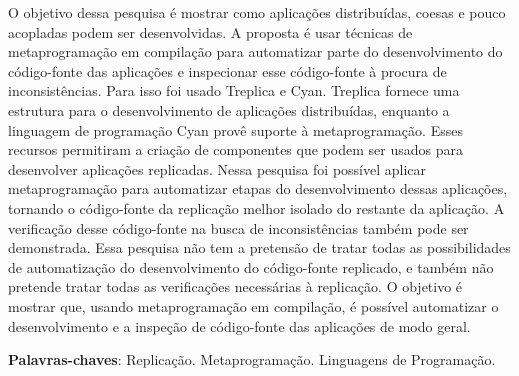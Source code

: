 \setlength{\absparsep}{18pt} %
                     
\begin{resumo}
\setlength{}
\setlength\emergencystretch{1pt}
O objetivo dessa pesquisa é mostrar como aplicações distribuídas, coesas e pouco acopladas podem ser desenvolvidas. A proposta é usar técnicas de metaprogramação em compilação para automatizar parte do desenvolvimento do código-fonte das aplicações e inspecionar esse código-fonte à procura de inconsistências. Para isso foi usado Treplica e Cyan. Treplica fornece uma estrutura para o desenvolvimento de aplicações distribuídas, enquanto a linguagem de programação Cyan provê suporte à metaprogramação. Esses recursos permitiram a criação de componentes que podem ser usados para desenvolver aplicações replicadas. Nessa pesquisa foi possível aplicar metaprogramação para automatizar etapas do desenvolvimento dessas aplicações, tornando o código-fonte da replicação melhor isolado do restante da aplicação. A verificação desse código-fonte na busca de inconsistências também pode ser demonstrada. Essa pesquisa não tem a pretensão de tratar todas as possibilidades de automatização do desenvolvimento do código-fonte replicado, e também não pretende tratar todas as verificações necessárias à replicação. O objetivo é mostrar que, usando metaprogramação em compilação, é possível automatizar o desenvolvimento e a inspeção de código-fonte das aplicações de modo geral.

\textbf{Palavras-chaves}: Replicação. Metaprogramação. Linguagens de Programação.

\end{resumo}

